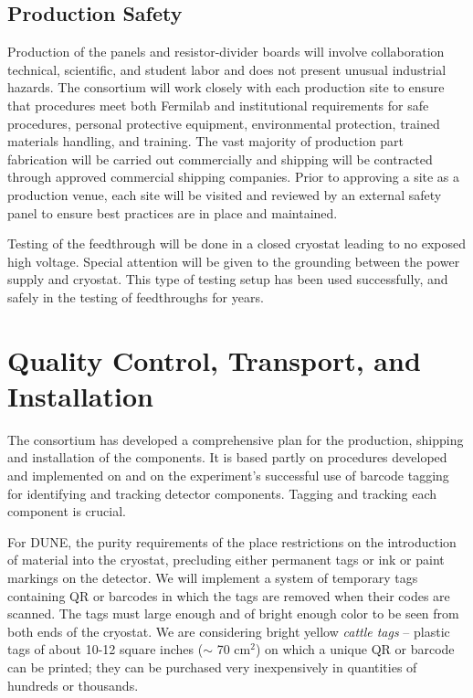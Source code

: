 \subsection{Production Safety}
\label{sec:fdsp-hv-prod-safety}

Production of the  panels and resistor-divider boards will involve collaboration technical, scientific, and student labor and  does not present unusual industrial hazards. The  consortium will work closely with each production site to ensure that procedures meet both Fermilab and institutional requirements for safe procedures, personal protective equipment, environmental protection, trained materials handling, and training. The vast majority of production part fabrication will be carried out commercially and shipping will be contracted through approved commercial shipping companies. Prior to approving a site as a production venue, each site will be visited and reviewed by an external safety panel to ensure best practices are in place and maintained. 

Testing of the  feedthrough will be done in a closed cryostat leading to no exposed high voltage.  Special attention will be given to the grounding between the power supply and cryostat.  This type of testing setup has been used successfully, and safely in the testing of  feedthroughs for years.

\clearpage
\section{Quality Control, Transport, and Installation}
\label{sec:fdsp-hv-transport}
The  consortium has developed a comprehensive  
plan for the production, shipping and installation of the   components. %
It is based partly on  procedures developed and implemented on  and on the \nova experiment's successful use of barcode tagging for identifying and tracking detector components.  Tagging and tracking each component is crucial. %

For DUNE, the purity requirements of the \lar place restrictions on the introduction of material into the cryostat, precluding either permanent tags or ink or paint markings on the detector.  We will implement a system of temporary tags containing QR or barcodes  in which the tags are removed when their codes are scanned.  %
The tags must large enough and of bright enough color to be seen from both ends of the cryostat.  We are considering %
bright yellow \textit{cattle tags} -- plastic tags of about 10-12 square inches ($\sim$ 70 cm$^{2}$) on which a unique QR\texttrademark{} or barcode can be printed; they can be purchased very inexpensively in quantities of hundreds or thousands.

